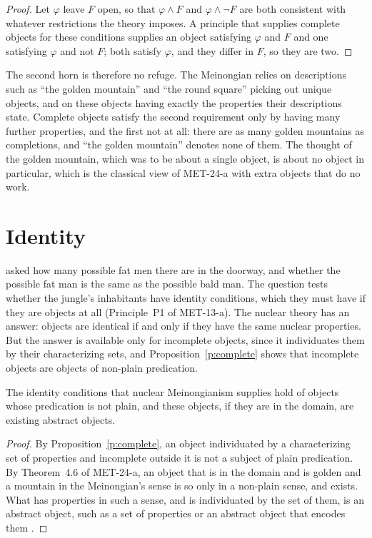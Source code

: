 \documentclass{situationist-preprint}
\begin{document}
\begin{proof}
Let $\varphi$ leave $F$ open, so that $\varphi \wedge F$ and $\varphi \wedge \neg F$ are both consistent with whatever restrictions the theory imposes. A principle that supplies complete objects for these conditions supplies an object satisfying $\varphi$ and $F$ and one satisfying $\varphi$ and not $F$; both satisfy $\varphi$, and they differ in $F$, so they are two.
\end{proof}

The second horn is therefore no refuge. The Meinongian relies on descriptions such as \enquote{the golden mountain} and \enquote{the round square} picking out unique objects, and on these objects having exactly the properties their descriptions state. Complete objects satisfy the second requirement only by having many further properties, and the first not at all: there are as many golden mountains as completions, and \enquote{the golden mountain} denotes none of them. The thought of the golden mountain, which was to be about a single object, is about no object in particular, which is the classical view of MET-24-a with extra objects that do no work.

\section{Identity}

\citet{Quine1948} asked how many possible fat men there are in the doorway, and whether the possible fat man is the same as the possible bald man. The question tests whether the jungle's inhabitants have identity conditions, which they must have if they are objects at all (Principle~P1 of MET-13-a). The nuclear theory has an answer: objects are identical if and only if they have the same nuclear properties. But the answer is available only for incomplete objects, since it individuates them by their characterizing sets, and Proposition~\ref{p:complete} shows that incomplete objects are objects of non-plain predication.

\begin{corollary}\label{c:identity}
The identity conditions that nuclear Meinongianism supplies hold of objects whose predication is not plain, and these objects, if they are in the domain, are existing abstract objects.
\end{corollary}

\begin{proof}
By Proposition~\ref{p:complete}, an object individuated by a characterizing set of properties and incomplete outside it is not a subject of plain predication. By Theorem~4.6 of MET-24-a, an object that is in the domain and is golden and a mountain in the Meinongian's sense is so only in a non-plain sense, and exists. What has properties in such a sense, and is individuated by the set of them, is an abstract object, such as a set of properties or an abstract object that encodes them \citep{Zalta1983}.
\end{proof}
\end{document}
